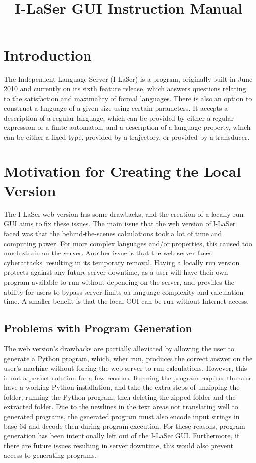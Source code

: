\documentclass{article}
\title{I-LaSer GUI Instruction Manual}
\begin{document}
\section{Introduction}
\par The Independent Language Server (I-LaSer) is a program, originally built in June 2010 and currently on its sixth feature release, which answers questions relating to the satisfaction and maximality of formal languages. There is also an option to construct a language of a given size using certain parameters. It accepts a description of a regular language, which can be provided by either a regular expression or a finite automaton, and a description of a language property, which can be either a fixed type, provided by a trajectory, or provided by a transducer. 

\section{Motivation for Creating the Local Version}
\par The I-LaSer web version has some drawbacks, and the creation of a locally-run GUI aims to fix these issues.
The main issue that the web version of I-LaSer faced was that the behind-the-scenes calculations took a lot of time and computing power. For more complex languages and/or properties, this caused too much strain on the server. Another issue is that the web server faced cyberattacks, resulting in its temporary removal. Having a locally run version protects against any future server downtime, as a user will have their own program available to run without depending on the server, and provides the ability for users to bypass server limits on language complexity and calculation time. A smaller benefit is that the local GUI can be run without Internet access. 

\subsection{Problems with Program Generation}
\par The web version's drawbacks are partially alleviated by allowing the user to generate a Python program, which, when run, produces the correct answer on the user's machine without forcing the web server to run calculations. However, this is not a perfect solution for a few reasons. Running the program requires the user have a working Python installation, and take the extra steps of unzipping the folder, running the Python program, then deleting the zipped folder and the extracted folder. Due to the newlines in the text areas not translating well to generated programs, the generated program must also encode input strings in base-64 and decode then during program execution. For these reasons, program generation has been intentionally left out of the I-LaSer GUI. Furthermore, if there are future issues resulting in server downtime, this would also prevent access to generating programs.
\end{document}
